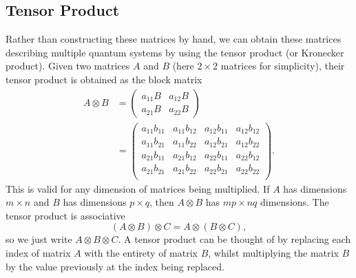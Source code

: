 \documentclass{article}
\begin{document}
\subsection{Tensor Product}
Rather than constructing these matrices by hand, we can obtain these matrices describing multiple quantum systems by using the tensor product (or Kronecker product). Given two matrices $A$ and $B$ (here $2\times 2$ matrices for simplicity), their tensor product is obtained as the block matrix
\begin{align*}
    A\otimes B &=\begin{pmatrix}
        a_{11}B&a_{12}B\\
        a_{21}B&a_{22}B
    \end{pmatrix} \\
               &=\begin{pmatrix}
                   a_{11}b_{11}&a_{11}b_{12}&a_{12}b_{11}&a_{12}b_{12}\\
                   a_{11}b_{21}&a_{11}b_{22}&a_{12}b_{21}&a_{12}b_{22}\\
                   a_{21}b_{11}&a_{21}b_{12}&a_{22}b_{11}&a_{22}b_{12}\\
                   a_{21}b_{21}&a_{21}b_{22}&a_{22}b_{21}&a_{22}b_{22}\\
               \end{pmatrix}.
\end{align*}
This is valid for any dimension of matrices being multiplied. If $A$ has dimensions $m\times n$ and $B$ has dimensions $p\times q$, then $A\otimes B$ has $mp\times nq$ dimensions. The tensor product is associative
\[
    (A\otimes B)\otimes C=A\otimes (B\otimes C),
\]
so we just write $A\otimes B\otimes C$. A tensor product can be thought of by replacing each index of matrix $A$ with the entirety of matrix $B$, whilst multiplying the matrix $B$ by the value previously at the index being replaced.
\end{document}
